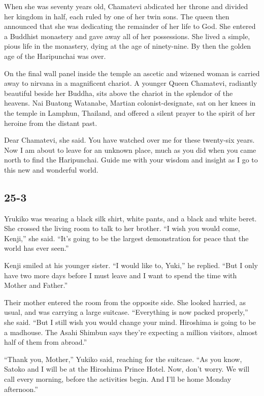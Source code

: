 \documentclass[]{article}
\begin{document}
{When she was seventy years old, Chamatevi abdicated her throne and divided her kingdom in half, each ruled by one of her twin sons.  The queen then announced that she was dedicating the remainder of her life to God.  She entered a Buddhist monastery and gave away all of her possessions.  She lived a simple, pious life in the monastery, dying at the age of ninety-nine.  By then the golden age of the Haripunchai was over.

On the final wall panel inside the temple an ascetic and wizened woman is carried away to nirvana in a magnificent chariot.  A younger Queen Chamatevi, radiantly beautiful beside her Buddha, sits above the chariot in the splendor of the heavens.  Nai Buatong Watanabe, Martian colonist-designate, sat on her knees in the temple in Lamphun, Thailand, and offered a silent prayer to the spirit of her heroine from the distant past.

Dear Chamatevi, she said.  You have watched over me for these twenty-six years.  Now I am about to leave for an unknown place, much as you did when you came north to find the Haripunchai.  Guide me with your wisdom and insight as I go to this new and wonderful world.


\subsection*{25-3}

Yrukiko was wearing a black silk shirt, white pants, and a black and white beret.  She crossed the living room to talk to her brother.  “I wish you would come, Kenji,” she said.  “It’s going to be the largest demonstration for peace that the world has ever seen.”

Kenji smiled at his younger sister.  “I would like to, Yuki,” he replied.  “But I only have two more days before I must leave and I want to spend the time with Mother and Father.”

Their mother entered the room from the opposite side.  She looked harried, as usual, and was carrying a large suitcase.  “Everything is now packed properly,” she said.  “But I still wish you would change your mind.  Hiroshima is going to be a madhouse.  The Asahi Shimbun says they’re expecting a million visitors, almost half of them from abroad.”

“Thank you, Mother,” Yukiko said, reaching for the suitcase.  “As you know, Satoko and I will be at the Hiroshima Prince Hotel.  Now, don’t worry.  We will call every morning, before the activities begin.  And I’ll be home Monday afternoon.”

}
\end{document}
